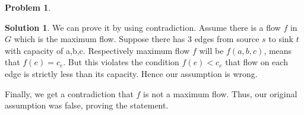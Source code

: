 \documentclass{article}
\theoremstyle{definition}
\newtheorem{problem}{Problem}
\newtheorem*{solution*}{Solution}
\newenvironment{solution}{\begin{solution*}}{{} \end{solution*}}
\begin{document}
\begin{problem}
\begin{enumerate}[label=(\alph*)]
\begin{enumerate}[label=(\roman*)]
\begin{solution}
		We can prove it by using contradiction. Assume there is a flow $f$ in $G$ which is the maximum flow. Suppose there has 3 edges from source $s$ to sink $t$ with capacity of a,b,c. Respectively maximum flow $f$ will be $f(a,b,c)$, means that $f(e) = c_e$. But this violates the condition $f(e)<c_e$ that flow on each edge is strictly less than its capacity. Hence our assumption is wrong.
		
		Finally, we get a contradiction that $f$ is not a maximum flow. Thus, our original assumption was false, proving the statement.
		
		\end{solution}
		
		
	\end{enumerate}
	
\end{enumerate}

\end{problem}

\newpage
\end{document}
